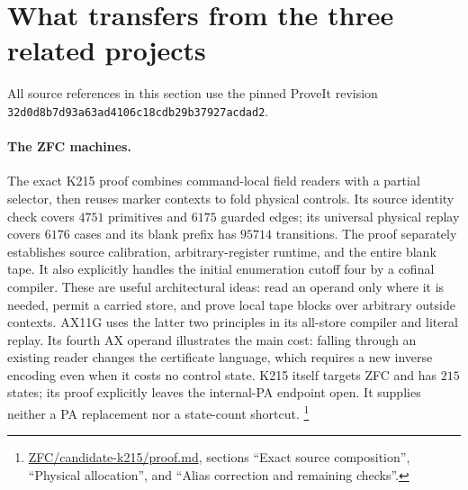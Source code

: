 \section{What transfers from the three related projects}
All source references in this section use the pinned ProveIt revision
\texttt{32d0d8b7d93a63ad4106c18cdb29b37927acdad2}.

\paragraph{The ZFC machines.}
The exact K215 proof combines command-local field readers with a partial
selector, then reuses marker contexts to fold physical controls. Its source
identity check covers $4751$ primitives and $6175$ guarded edges; its
universal physical replay covers $6176$ cases and its blank prefix has
$95714$ transitions. The proof separately establishes source calibration,
arbitrary-register runtime, and the entire blank tape. It also explicitly
handles the initial enumeration cutoff four by a cofinal compiler.
These are useful architectural ideas: read an operand only where it is
needed, permit a carried store, and prove local tape blocks over arbitrary
outside contexts. AX11G uses the latter two principles in its all-store
compiler and literal replay. Its fourth AX operand illustrates the main
cost: falling through an existing reader changes the certificate language,
which requires a new inverse encoding even when it costs no control state.
K215 itself targets ZFC and has $215$ states; its proof explicitly leaves
the internal-PA endpoint open. It supplies neither a PA replacement nor
a state-count shortcut.
\footnote{\href{https://github.com/VladimirReshetnikov/ProveIt/blob/32d0d8b7d93a63ad4106c18cdb29b37927acdad2/Computability/BusyBeaver/Research/ZFC/candidate-k215/proof.md}{ZFC/candidate-k215/proof.md}, sections ``Exact source composition'', ``Physical allocation'', and ``Alias correction and remaining checks''.}

